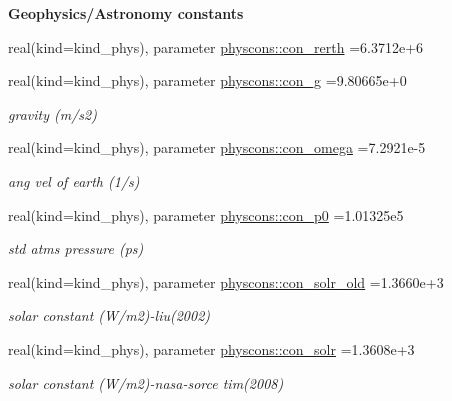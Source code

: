 \begin{Indent}{\bf Geophysics/\+Astronomy constants}\par
\begin{DoxyCompactItemize}
\item 
real(kind=kind\+\_\+phys), parameter \hyperlink{namespacephyscons_a45809304b133b2581328b19b36dd47bc}{physcons\+::con\+\_\+rerth} =6.\+3712e+6
\item 
real(kind=kind\+\_\+phys), parameter \hyperlink{namespacephyscons_a7aa20dba53943ce9bcecb2ebef0e308d}{physcons\+::con\+\_\+g} =9.\+80665e+0
\begin{DoxyCompactList}\small\item\em gravity (m/s2) \end{DoxyCompactList}\item 
real(kind=kind\+\_\+phys), parameter \hyperlink{namespacephyscons_a697e780a35d1cc1b3d5144b7c8019d62}{physcons\+::con\+\_\+omega} =7.\+2921e-\/5
\begin{DoxyCompactList}\small\item\em ang vel of earth (1/s) \end{DoxyCompactList}\item 
real(kind=kind\+\_\+phys), parameter \hyperlink{namespacephyscons_a9d081f8ee3735aea4c64b2c8eb5486b8}{physcons\+::con\+\_\+p0} =1.\+01325e5
\begin{DoxyCompactList}\small\item\em std atms pressure (ps) \end{DoxyCompactList}\item 
real(kind=kind\+\_\+phys), parameter \hyperlink{namespacephyscons_a5649a8745fd2e9fb453e6fa235c11039}{physcons\+::con\+\_\+solr\+\_\+old} =1.\+3660e+3
\begin{DoxyCompactList}\small\item\em solar constant (W/m2)-\/liu(2002) \end{DoxyCompactList}\item 
real(kind=kind\+\_\+phys), parameter \hyperlink{namespacephyscons_a146fd04a08d9f5fac3389f105fd81c23}{physcons\+::con\+\_\+solr} =1.\+3608e+3
\begin{DoxyCompactList}\small\item\em solar constant (W/m2)-\/nasa-\/sorce tim(2008) \end{DoxyCompactList}\end{DoxyCompactItemize}
\end{Indent}

